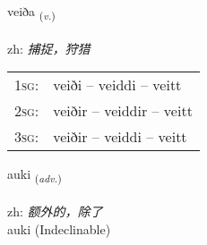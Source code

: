 \documentclass[frontgrid, backgrid]{flacards}\usepackage[]{graphicx}\usepackage[]{color}
\begin{document}
\renewcommand{\flhead}{\vskip5pt \fboxsep=0pt {\small\bfseries\footnotesize Sagnorð | 动词}}
\renewcommand{\fcfoot}{\vskip5pt \fboxsep=0pt \hspace{2pt}{\small\bfseries\footnotesize 2K}}

\renewcommand{\blhead}{\vskip5pt {\small\bfseries\footnotesize Sagnorð | 动词 }}
\renewcommand{\bcfoot}{\vskip5pt \hspace{2pt}{\small\bfseries\footnotesize 2K}}


{veiða \small{\textsubscript{(\textit{v.})}} \\[1ex] %
\textphonetic{[veiːða]} \\
zh: \emph{捕捉，狩猎} \\  [2ex]
\renewcommand*{\arraystretch}{0.8}
\begin{tabular}{p{1cm}l}
\textsc{1sg}: & veiði -- veiddi -- veitt \\ 
\textsc{2sg}: & veiðir -- veiddir -- veitt \\ 
\textsc{3sg}: & veiðir -- veiddi -- veitt \\ 
\end{tabular}
}


\renewcommand{\flhead}{\vskip5pt \fboxsep=0pt {\small\bfseries\footnotesize Atviksorð | 副词}}
\renewcommand{\fcfoot}{\vskip5pt \fboxsep=0pt \hspace{2pt}{\small\bfseries\footnotesize 2K}}

\renewcommand{\blhead}{\vskip5pt {\small\bfseries\footnotesize Atviksorð | 副词 }}
\renewcommand{\bcfoot}{\vskip5pt \hspace{2pt}{\small\bfseries\footnotesize 2K}}


{auki \small{\textsubscript{(\textit{adv.})}} \\[1ex]
\textphonetic{[œiːcɪ]} \\
zh: \emph{额外的，除了} \\  [2ex]
auki (Indeclinable)}

\renewcommand{\flhead}{\vskip5pt \fboxsep=0pt {\small\bfseries\footnotesize Lýsingarorð | 形容词}}
\renewcommand{\fcfoot}{\vskip5pt \fboxsep=0pt \hspace{2pt}{\small\bfseries\footnotesize 2K}}
\end{document}
